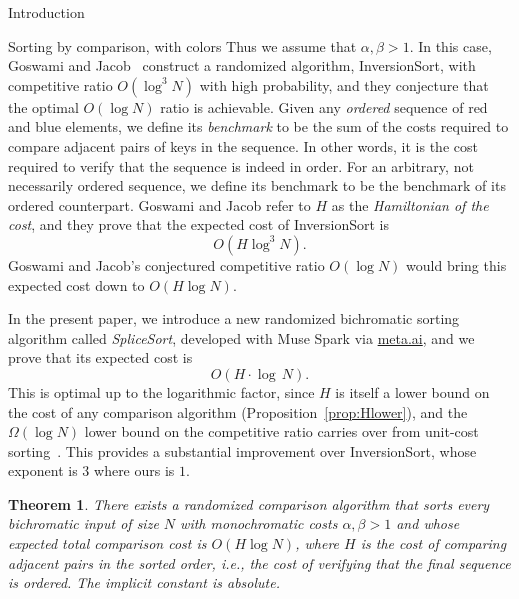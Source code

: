 \documentclass[11pt]{article}
\newtheorem{thm}{Theorem}[section]
\theoremstyle{definition}
\numberwithin{equation}{section}
\begin{document}
\begin{section}{Introduction}
\begin{humanblock}
\begin{subsection}{Sorting by comparison, with colors}
Thus we assume that $\alpha,\beta>1$. In this case, Goswami and Jacob~\cite{goswami2024bichromatic} construct a randomized algorithm, {\ttfamily InversionSort}, with competitive ratio $O(\log^3 N)$ with high probability, and they conjecture that the optimal $O(\log N)$ ratio is achievable. Given any {\em ordered} sequence of red and blue elements, we define its {\em benchmark} to be the sum of the costs required to compare adjacent pairs of keys in the sequence. In other words, it is the cost required to verify that the sequence is indeed in order. For an arbitrary, not necessarily ordered sequence, we define its benchmark to be the benchmark of its ordered counterpart. Goswami and Jacob refer to $H$ as the {\em Hamiltonian of the cost}, and they prove that the expected cost of {\ttfamily InversionSort} is
$$
O(H \log^3 N).
$$
Goswami and Jacob's conjectured competitive ratio $O(\log N)$ would bring this expected cost down to $O(H \log N)$.

In the present paper, we introduce a new randomized bichromatic sorting algorithm called {\em SpliceSort}, developed with Muse Spark via {\ttfamily \href{http://meta.ai}{meta.ai}}, and we prove that its expected cost is
$$
O(H\cdot\operatorname{log}\,N).
$$
This is optimal up to the logarithmic factor, since $H$ is itself a lower bound on the cost of any comparison algorithm (Proposition~\ref{prop:Hlower}), and the $\Omega(\log N)$ lower bound on the competitive ratio carries over from unit-cost sorting~\cite{goswami2024bichromatic}. This provides a substantial improvement over {\ttfamily InversionSort}, whose exponent is $3$ where ours is $1$.

\end{subsection}


\begin{thm}\label{thm:main}
There exists a randomized comparison algorithm that sorts every
bichromatic input of size $N$ with monochromatic costs
$\alpha, \beta > 1$ and whose expected total comparison cost is
$O(H \log N)$, where $H$ is the cost of comparing adjacent pairs in the
sorted order, i.e., the cost of verifying that the final sequence is ordered. The implicit constant is absolute.
\end{thm}


\end{humanblock}
\end{section}
\end{document}
